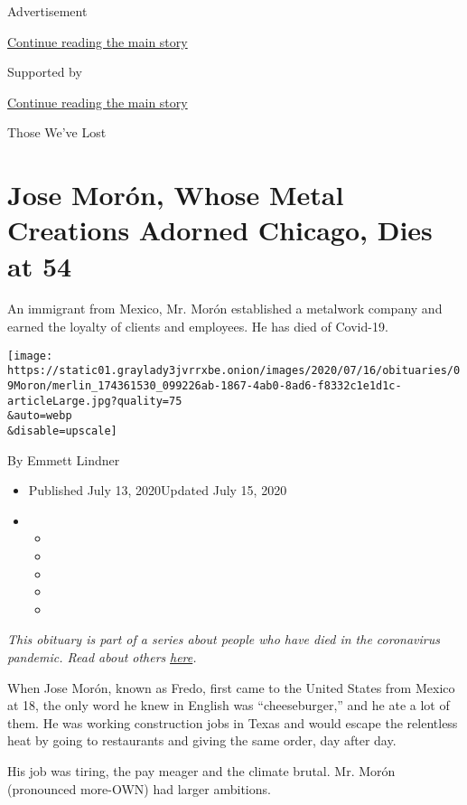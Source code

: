Advertisement

\protect\hyperlink{after-top}{Continue reading the main story}

Supported by

\protect\hyperlink{after-sponsor}{Continue reading the main story}

Those We've Lost

\hypertarget{jose-moruxf3n-whose-metal-creations-adorned-chicago-dies-at-54}{%
\section{Jose Morón, Whose Metal Creations Adorned Chicago, Dies at
54}\label{jose-moruxf3n-whose-metal-creations-adorned-chicago-dies-at-54}}

An immigrant from Mexico, Mr. Morón established a metalwork company and
earned the loyalty of clients and employees. He has died of Covid-19.

\texttt{[image: https://static01.graylady3jvrrxbe.onion/images/2020/07/16/obituaries/09Moron/merlin\_174361530\_099226ab-1867-4ab0-8ad6-f8332c1e1d1c-articleLarge.jpg?quality=75\\\&auto=webp\\\&disable=upscale]}

By Emmett Lindner

\begin{itemize}
\item
  Published July 13, 2020Updated July 15, 2020
\item
  \begin{itemize}
  \item
  \item
  \item
  \item
  \item
  \end{itemize}
\end{itemize}

\emph{This obituary is part of a series about people who have died in
the coronavirus pandemic. Read about others}
\href{https://www.nytimes3xbfgragh.onion/interactive/2020/obituaries/people-died-coronavirus-obituaries.html}{\emph{here}}\emph{.}

When Jose Morón, known as Fredo, first came to the United States from
Mexico at 18, the only word he knew in English was ``cheeseburger,'' and
he ate a lot of them. He was working construction jobs in Texas and
would escape the relentless heat by going to restaurants and giving the
same order, day after day.

His job was tiring, the pay meager and the climate brutal. Mr. Morón
(pronounced more-OWN) had larger ambitions.

